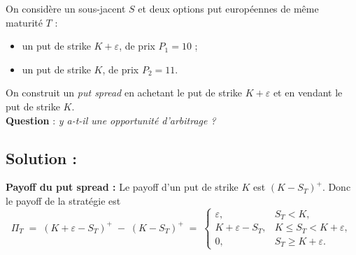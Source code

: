 \begin{exerciseBox}
On considère un sous-jacent $S$ et deux options put européennes de même maturité $T$ :  

 \begin{itemize}
     \item un put de strike $K + \varepsilon$, de prix $P_1 = 10$ ;  
    \item un put de strike $K$, de prix $P_2 = 11$.  
 \end{itemize}

On construit un \emph{put spread} en achetant le put de strike $K + \varepsilon$ et en vendant le put de strike $K$.  
\\
\textbf{Question} : \textit{y a-t-il une opportunité d’arbitrage ?}
\end{exerciseBox}



\subsection*{Solution :}


\textbf{Payoff du put spread :}
Le payoff d’un put de strike $K$ est $(K-S_T)^+$. Donc le payoff de la stratégie est
\[
\Pi_T \;=\; (K+\varepsilon - S_T)^+ \;-\; (K - S_T)^+ \;=\;
\begin{cases}
\varepsilon, & S_T < K,\\[3pt]
K+\varepsilon - S_T, & K \le S_T < K+\varepsilon,\\[3pt]
0, & S_T \ge K+\varepsilon.
\end{cases}
\]

\begin{center}
\end{center}

